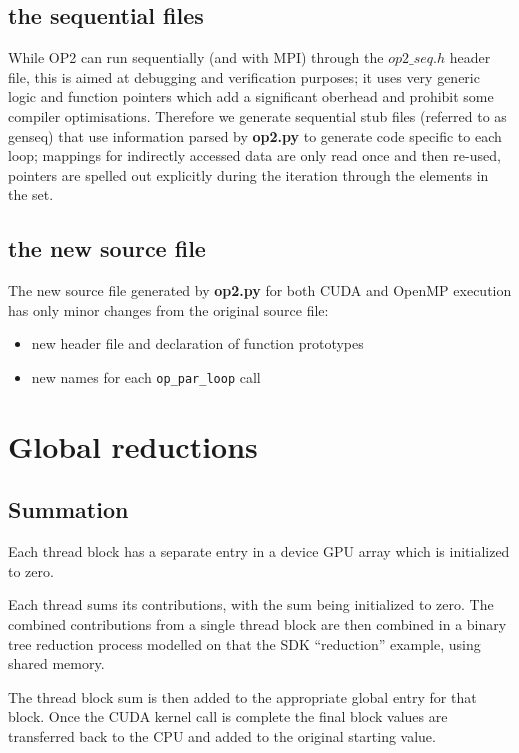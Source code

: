 \documentclass[11pt]{article}
\begin{document}
\subsection{the sequential files}

While OP2 can run sequentially (and with MPI) through the $op2\_seq.h$
header file, this is aimed at debugging and verification purposes; it uses
very generic logic and function pointers which add a significant oberhead
and prohibit some compiler optimisations. Therefore we generate
sequential stub files (referred to as genseq) that use information parsed by
 {\bf op2.py} to generate code specific to each loop; mappings for indirectly
 accessed data are only read once and then re-used, pointers are spelled
 out explicitly during the iteration through the elements in the set.

\subsection{the new source file}

The new source file generated by {\bf op2.py} for both CUDA and OpenMP
execution has only minor changes from the original source file:
\begin{itemize}
\item
new header file and declaration of function prototypes

\item
new names for each {\tt op\_par\_loop} call
\end{itemize}

\newpage

\section{Global reductions}

\subsection{Summation}

Each thread block has a separate entry in a device GPU array which is
initialized to zero.

Each thread sums its contributions, with the sum being initialized to zero.
The combined contributions from a single thread block are then combined
in a binary tree reduction process modelled on that the SDK ``reduction''
example, using shared memory.

The thread block sum is then added to the appropriate global entry for that
block.  Once the CUDA kernel call is complete the final block values are
transferred back to the CPU and added to the original starting value.
\end{document}
